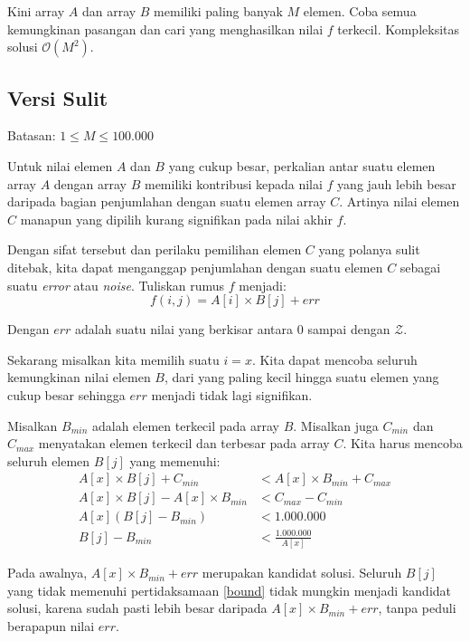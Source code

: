 \documentclass[../main_editorial.tex]{subfiles} %
\newcommand{\bigO}[1]{\mathcal{O}(#1)}
\newcommand{\maxValue}{\mathcal{Z}}
\begin{document}
Kini array $A$ dan array $B$ memiliki paling banyak $M$ elemen. Coba semua kemungkinan pasangan dan cari yang menghasilkan nilai $f$ terkecil. Kompleksitas solusi $\bigO{M^2}$.

\subsection*{Versi Sulit}
Batasan: $1 \le M \le 100.000$

Untuk nilai elemen $A$ dan $B$ yang cukup besar, perkalian antar suatu elemen array $A$ dengan array $B$ memiliki kontribusi kepada nilai $f$ yang jauh lebih besar daripada bagian penjumlahan dengan suatu elemen array $C$. Artinya nilai elemen $C$ manapun yang dipilih kurang signifikan pada nilai akhir $f$.

Dengan sifat tersebut dan perilaku pemilihan elemen $C$ yang polanya sulit ditebak, kita dapat menganggap penjumlahan dengan suatu elemen $C$ sebagai suatu \textit{error} atau \textit{noise}. Tuliskan rumus $f$ menjadi:
$$f(i,j) = A[i] \times B[j] + err$$

Dengan $err$ adalah suatu nilai yang berkisar antara $0$ sampai dengan $\maxValue$.

Sekarang misalkan kita memilih suatu $i=x$. Kita dapat mencoba seluruh kemungkinan nilai elemen $B$, dari yang paling kecil hingga suatu elemen yang cukup besar sehingga $err$ menjadi tidak lagi signifikan. 

Misalkan $B_{min}$ adalah elemen terkecil pada array $B$. Misalkan juga $C_{min}$ dan $C_{max}$ menyatakan elemen terkecil dan terbesar pada array $C$. Kita harus mencoba seluruh elemen $B[j]$ yang memenuhi:
\begin{align}
A[x] \times B[j] + C_{min} &< A[x] \times B_{min} + C_{max} \nonumber \\
A[x] \times B[j] - A[x] \times B_{min} &< C_{max} - C_{min} \nonumber\\
A[x] (B[j] - B_{min}) &< 1.000.000 \nonumber \\
B[j] - B_{min} &< \frac{1.000.000}{A[x]} \label{bound}
\end{align}

Pada awalnya, $A[x] \times B_{min} + err$ merupakan kandidat solusi. Seluruh $B[j]$ yang tidak memenuhi pertidaksamaan \ref{bound} tidak mungkin menjadi kandidat solusi, karena sudah pasti lebih besar daripada $A[x] \times B_{min} + err$, tanpa peduli berapapun nilai $err$.
\end{document}
